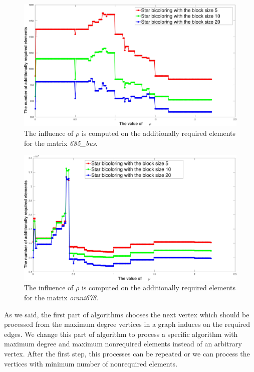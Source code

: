\documentclass[11pt, twoside,a4paper]{book}
\begin{document}
\begin{figure}
\includegraphics[width=0.9\linewidth]{rho_value_685_bus}
\caption{The influence of $\rho$ is computed on the additionally required elements
for the matrix \textit{685\_bus}.}
\label{rho_value_685_bus}
\end{figure}

\begin{figure}
\includegraphics[width=0.9\linewidth]{rho_value_orani678}
\caption{The influence of $\rho$ is computed on the additionally required elements
for the matrix \textit{orani678}.}
\label{rho_value_orani678}
\end{figure}

As we said, the first part of algorithms chooses the next vertex
which should be processed from the maximum degree vertices
in a graph induces on the required edges.
We change this part of algorithm to process a specific algorithm
with maximum degree and maximum nonrequired elements instead of
an arbitrary vertex. After the first step, this processes can be
repeated or we can process the vertices with
minimum number of nonrequired elements.
\end{document}
